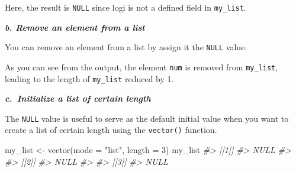\documentclass[
]{book}
\newenvironment{Shaded}{\begin{snugshade}}{\end{snugshade}}
\newcommand{\AttributeTok}[1]{\textcolor[rgb]{0.77,0.63,0.00}{#1}}
\newcommand{\CommentTok}[1]{\textcolor[rgb]{0.56,0.35,0.01}{\textit{#1}}}
\newcommand{\ConstantTok}[1]{\textcolor[rgb]{0.00,0.00,0.00}{#1}}
\newcommand{\DecValTok}[1]{\textcolor[rgb]{0.00,0.00,0.81}{#1}}
\newcommand{\FunctionTok}[1]{\textcolor[rgb]{0.00,0.00,0.00}{#1}}
\newcommand{\NormalTok}[1]{#1}
\newcommand{\OtherTok}[1]{\textcolor[rgb]{0.56,0.35,0.01}{#1}}
\newcommand{\SpecialCharTok}[1]{\textcolor[rgb]{0.00,0.00,0.00}{#1}}
\newcommand{\StringTok}[1]{\textcolor[rgb]{0.31,0.60,0.02}{#1}}
\begin{document}
\begin{Shaded}
\end{Shaded}

Here, the result is \texttt{NULL} since logi is not a defined field in \texttt{my\_list}.

\textbf{\emph{b. Remove an element from a list}}

You can remove an element from a list by assign it the \texttt{NULL} value.

\begin{Shaded}
\end{Shaded}

As you can see from the output, the element \texttt{num} is removed from \texttt{my\_list}, leading to the length of \texttt{my\_list} reduced by 1.

\textbf{\emph{c.~Initialize a list of certain length}}

The \texttt{NULL} value is useful to serve as the default initial value when you want to create a list of certain length using the \texttt{vector()} function.

\begin{Shaded}
\begin{Highlighting}[]
\NormalTok{my\_list }\OtherTok{\textless{}{-}} \FunctionTok{vector}\NormalTok{(}\AttributeTok{mode =} \StringTok{"list"}\NormalTok{, }\AttributeTok{length =} \DecValTok{3}\NormalTok{)}
\NormalTok{my\_list}
\CommentTok{\#\textgreater{} [[1]]}
\CommentTok{\#\textgreater{} NULL}
\CommentTok{\#\textgreater{} }
\CommentTok{\#\textgreater{} [[2]]}
\CommentTok{\#\textgreater{} NULL}
\CommentTok{\#\textgreater{} }
\CommentTok{\#\textgreater{} [[3]]}
\CommentTok{\#\textgreater{} NULL}
\end{Highlighting}
\end{Shaded}
\end{document}
